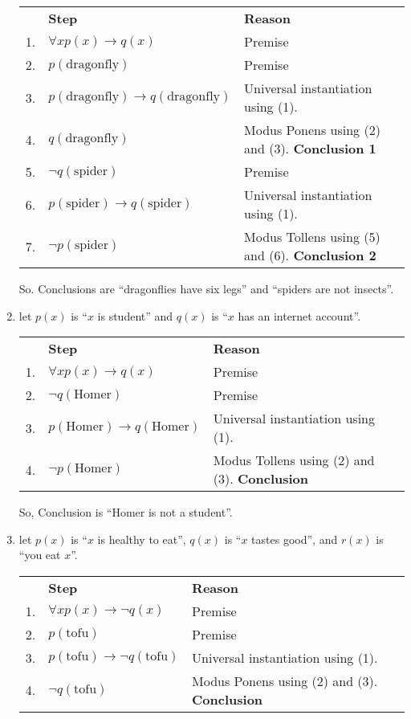 \begin{enumerate}
    \begin{tabular}{p{0.2cm} p{5cm} p{8cm}}
        & \textbf{Step} & \textbf{Reason}\\
        1.& $\forall x p(x) \rightarrow q(x)$ & Premise \\
        2.& $p(\text{dragonfly})$ & Premise \\
        3.& $p(\text{dragonfly}) \rightarrow q(\text{dragonfly})$ & Universal instantiation using (1). \\
        4.& $q(\text{dragonfly})$ & Modus Ponens using (2) and (3). \textbf{Conclusion 1}\\
        5.& $\neg q(\text{spider})$ & Premise \\
        6.& $p(\text{spider}) \rightarrow q(\text{spider})$ & Universal instantiation using (1).\\
        7.& $\neg p(\text{spider})$ & Modus Tollens using (5) and (6). \textbf{Conclusion 2}\\
    \end{tabular}

    So. Conclusions are ``dragonflies have six legs'' and ``spiders are not insects''.

    \item let $p(x)$ is ``$x$ is student'' and $q(x)$ is ``$x$ has an internet account''.
    
    \begin{tabular}{p{0.2cm} p{5cm} p{8cm}}
        & \textbf{Step} & \textbf{Reason}\\
        1.& $\forall x p(x) \rightarrow q(x)$ & Premise \\
        2.& $\neg q(\text{Homer})$ & Premise \\
        3.& $p(\text{Homer}) \rightarrow q(\text{Homer})$ & Universal instantiation using (1).\\
        4.& $\neg p(\text{Homer})$ & Modus Tollens using (2) and (3). \textbf{Conclusion}\\
    \end{tabular}

    So, Conclusion is ``Homer is not a student''.

    \item let $p(x)$ is ``$x$ is healthy to eat'', $q(x)$ is ``$x$ tastes good'', and $r(x)$ is ``you eat $x$''.
    
    \begin{tabular}{p{0.2cm} p{5cm} p{8cm}}
        & \textbf{Step} & \textbf{Reason}\\
        1.& $\forall x p(x) \rightarrow \neg q(x)$ & Premise \\
        2.& $p(\text{tofu})$ & Premise \\
        3.& $p(\text{tofu}) \rightarrow \neg q(\text{tofu})$ & Universal instantiation using (1).\\
        4.& $\neg q(\text{tofu})$ & Modus Ponens using (2) and (3). \textbf{Conclusion}\\
    \end{tabular}


\end{enumerate}
